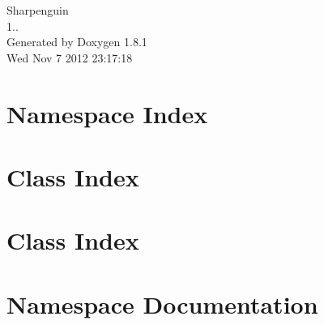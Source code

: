 \documentclass{book}
\begin{document}
\hypersetup{pageanchor=false,citecolor=blue}
\begin{titlepage}
\vspace*{7cm}
\begin{center}
{\Large Sharpenguin \\[1ex]\large 1.. }\\
\vspace*{1cm}
{\large Generated by Doxygen 1.8.1}\\
\vspace*{0.5cm}
{\small Wed Nov 7 2012 23:17:18}\\
\end{center}
\end{titlepage}
\clearemptydoublepage
{}
\tableofcontents
\clearemptydoublepage
{}
\hypersetup{pageanchor=true,citecolor=blue}
\chapter{Namespace Index}

\chapter{Class Index}

\chapter{Class Index}

\chapter{Namespace Documentation}










\end{document}
